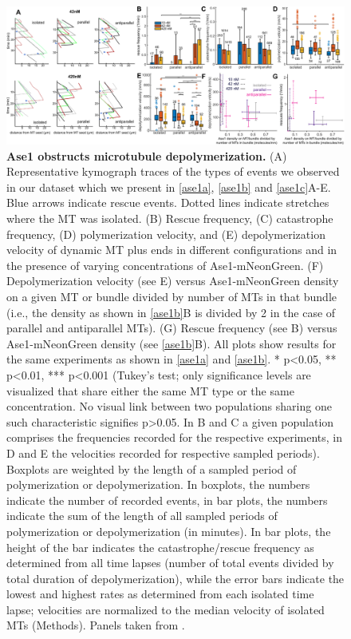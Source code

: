 \begin{figure}[h]
    \centering
    \includegraphics[width=1\linewidth]{Figures/ase1_1d.png}
    \caption[Ase1 obstructs microtubule depolymerization.]{
    \textbf{Ase1 obstructs microtubule depolymerization.} (A) Representative kymograph traces of the types of events we observed in our dataset which we present in \autoref{ase1a}, \autoref{ase1b} and \autoref{ase1c}A-E. Blue arrows indicate rescue events. Dotted lines indicate stretches where the MT was isolated. (B) Rescue frequency, (C) catastrophe frequency, (D) polymerization velocity, and (E) depolymerization velocity of dynamic MT plus ends in different configurations and in the presence of varying concentrations of Ase1-mNeonGreen. (F) Depolymerization velocity (see E) versus Ase1-mNeonGreen density on a given MT or bundle divided by number of MTs in that bundle (i.e., the density as shown in \autoref{ase1b}B is divided by 2 in the case of parallel and antiparallel MTs).  (G) Rescue frequency (see B) versus Ase1-mNeonGreen density (see \autoref{ase1b}B). All plots show results for the same experiments as shown in \autoref{ase1a} and \autoref{ase1b}. * p<0.05, ** p<0.01, *** p<0.001 (Tukey's test; only significance levels are visualized that share either the same MT type or the same concentration. No visual link between two populations sharing one such characteristic signifies  p>0.05. In B and C a given population comprises the frequencies recorded for the respective experiments, in D and E the velocities recorded for respective sampled periods). Boxplots are weighted by the length of a sampled period of polymerization or depolymerization. In boxplots, the numbers indicate the number of recorded events, in bar plots, the numbers indicate the sum of the length of all sampled periods of polymerization or depolymerization (in minutes). In bar plots, the height of the bar indicates the catastrophe/rescue frequency as determined from all time lapses (number of total events divided by total duration of depolymerization), while the error bars indicate the lowest and highest rates as determined from each isolated time lapse; velocities are normalized to the median velocity of isolated MTs (Methods). Panels taken from \cite{Krattenmacher2024}.
        }\label{ase1d}
\end{figure}

